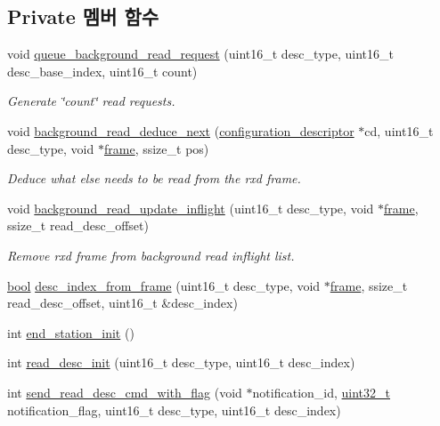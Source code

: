 \subsection*{Private 멤버 함수}
\begin{DoxyCompactItemize}
\item 
void \hyperlink{classavdecc__lib_1_1end__station__imp_a5dcbf7253fe2b67afcc2c41cc9afe826}{queue\+\_\+background\+\_\+read\+\_\+request} (uint16\+\_\+t desc\+\_\+type, uint16\+\_\+t desc\+\_\+base\+\_\+index, uint16\+\_\+t count)
\begin{DoxyCompactList}\small\item\em Generate \char`\"{}count\char`\"{} read requests. \end{DoxyCompactList}\item 
void \hyperlink{classavdecc__lib_1_1end__station__imp_ac9f6c6b15267ddc8bffecf2654a6f03d}{background\+\_\+read\+\_\+deduce\+\_\+next} (\hyperlink{classavdecc__lib_1_1configuration__descriptor}{configuration\+\_\+descriptor} $\ast$cd, uint16\+\_\+t desc\+\_\+type, void $\ast$\hyperlink{gst__avb__playbin_8c_ac8e710e0b5e994c0545d75d69868c6f0}{frame}, ssize\+\_\+t pos)
\begin{DoxyCompactList}\small\item\em Deduce what else needs to be read from the rx\textquotesingle{}d frame. \end{DoxyCompactList}\item 
void \hyperlink{classavdecc__lib_1_1end__station__imp_a9ed35744b83a722e59dee6fbf729bf51}{background\+\_\+read\+\_\+update\+\_\+inflight} (uint16\+\_\+t desc\+\_\+type, void $\ast$\hyperlink{gst__avb__playbin_8c_ac8e710e0b5e994c0545d75d69868c6f0}{frame}, ssize\+\_\+t read\+\_\+desc\+\_\+offset)
\begin{DoxyCompactList}\small\item\em Remove rx\textquotesingle{}d frame from background read inflight list. \end{DoxyCompactList}\item 
\hyperlink{avb__gptp_8h_af6a258d8f3ee5206d682d799316314b1}{bool} \hyperlink{classavdecc__lib_1_1end__station__imp_aa169d9cd63c3e8d588717a7a6f132fde}{desc\+\_\+index\+\_\+from\+\_\+frame} (uint16\+\_\+t desc\+\_\+type, void $\ast$\hyperlink{gst__avb__playbin_8c_ac8e710e0b5e994c0545d75d69868c6f0}{frame}, ssize\+\_\+t read\+\_\+desc\+\_\+offset, uint16\+\_\+t \&desc\+\_\+index)
\item 
int \hyperlink{classavdecc__lib_1_1end__station__imp_a86c3a7a61fd1446d88bd8c33067b1c0c}{end\+\_\+station\+\_\+init} ()
\item 
int \hyperlink{classavdecc__lib_1_1end__station__imp_a6f1d8190a18143551c01f029cc554a50}{read\+\_\+desc\+\_\+init} (uint16\+\_\+t desc\+\_\+type, uint16\+\_\+t desc\+\_\+index)
\item 
int \hyperlink{classavdecc__lib_1_1end__station__imp_af43caa2c31793407160890148e877b06}{send\+\_\+read\+\_\+desc\+\_\+cmd\+\_\+with\+\_\+flag} (void $\ast$notification\+\_\+id, \hyperlink{parse_8c_a6eb1e68cc391dd753bc8ce896dbb8315}{uint32\+\_\+t} notification\+\_\+flag, uint16\+\_\+t desc\+\_\+type, uint16\+\_\+t desc\+\_\+index)
\end{DoxyCompactItemize}
